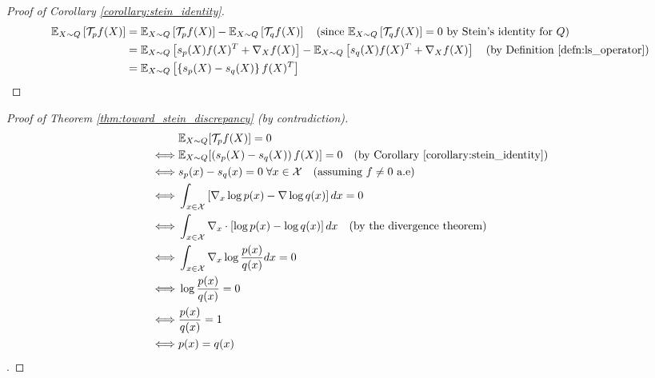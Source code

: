 \begin{proof}[Proof of Corollary \ref{corollary:stein_identity}]
\begin{align*}
\mathbb{E}_{X \sim Q} \left[\mathcal{T}_p f(X) \right] &= \mathbb{E}_{X \sim Q}\left[\mathcal{T}_p f(X)\right] - \mathbb{E}_{X \sim Q}\left[\mathcal{T}_q f(X)\right] \quad \text{(since $ \mathbb{E}_{X \sim Q}\left[\mathcal{T}_q f(X)\right]  = 0$ by Stein's identity for $Q$)}\\
&= \mathbb{E}_{X \sim Q} \left[s_p(X)f(X)^T + \nabla_X f(X) \right] - \mathbb{E}_{X \sim Q} \left[s_q(X)f(X)^T + \nabla_X f(X) \right] \quad \text{(by Definition \ref{defn:ls_operator})}\\
&= \mathbb{E}_{X \sim Q} \left[\left\{s_p(X) - s_q(X) \right\}f(X)^T\right] \qedhere
\end{align*}
\end{proof}

\begin{proof}[Proof of Theorem \ref{thm:toward_stein_discrepancy} (by contradiction)]
\begin{align*}
&\mathbb{E}_{X \sim Q}[\mathcal{T}_p f(X)] = 0 \\
\iff & \mathbb{E}_{X \sim Q}[\left(s_p(X) - s_q(X)\right)f(X)] = 0 \quad \text{(by Corollary \ref{corollary:stein_identity})}\\
\iff & s_p(x) - s_q(x) = 0 \hspace{0.1cm} \forall x \in \mathcal{X} \quad \text{(assuming $f \not= 0$ a.e)}\\
\iff & \int_{x \in \mathcal{X}} \left[\nabla_x \log p(x) - \nabla \log q(x) \right]dx = 0\\
\iff & \int_{x \in \mathcal{X}} \nabla_x \cdot \left[\log p(x) - \log q(x) \right]dx \quad \text{(by the divergence theorem)}\\
\iff & \int_{x \in \mathcal{X}} \nabla_x \log \frac{p(x)}{q(x)}dx = 0 \\
\iff & \log \frac{p(x)}{q(x)} = 0\\
\iff & \frac{p(x)}{q(x)} = 1 \\
\iff & p(x) = q(x)
\end{align*}
. 
\end{proof}

